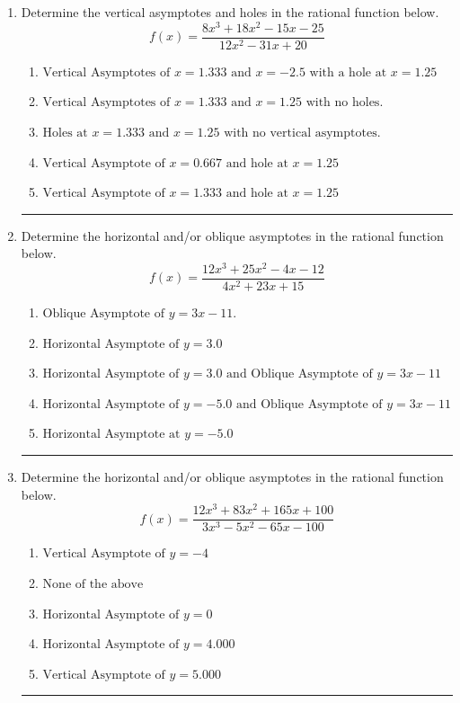 \documentclass[14pt]{extbook}
\newcommand{\litem}[1]{\item#1\hspace*{-1cm}\rule{\textwidth}{0.4pt}}
\begin{document}
\begin{enumerate}
{\begin{enumerate}[label=\Alph*.]
\end{enumerate} }
\litem{
Determine the vertical asymptotes and holes in the rational function below.\[ f(x) = \frac{8x^{3} +18 x^{2} -15 x -25}{12x^{2} -31 x + 20} \]\begin{enumerate}[label=\Alph*.]
\item \( \text{Vertical Asymptotes of } x = 1.333 \text{ and } x = -2.5 \text{ with a hole at } x = 1.25 \)
\item \( \text{Vertical Asymptotes of } x = 1.333 \text{ and } x = 1.25 \text{ with no holes.} \)
\item \( \text{Holes at } x = 1.333 \text{ and } x = 1.25 \text{ with no vertical asymptotes.} \)
\item \( \text{Vertical Asymptote of } x = 0.667 \text{ and hole at } x = 1.25 \)
\item \( \text{Vertical Asymptote of } x = 1.333 \text{ and hole at } x = 1.25 \)

\end{enumerate} }
\litem{
Determine the horizontal and/or oblique asymptotes in the rational function below.\[ f(x) = \frac{12x^{3} +25 x^{2} -4 x -12}{4x^{2} +23 x + 15} \]\begin{enumerate}[label=\Alph*.]
\item \( \text{Oblique Asymptote of } y = 3x -11. \)
\item \( \text{Horizontal Asymptote of } y = 3.0  \)
\item \( \text{Horizontal Asymptote of } y = 3.0 \text{ and Oblique Asymptote of } y = 3x -11 \)
\item \( \text{Horizontal Asymptote of } y = -5.0 \text{ and Oblique Asymptote of } y = 3x -11 \)
\item \( \text{Horizontal Asymptote at } y = -5.0 \)

\end{enumerate} }
\litem{
Determine the horizontal and/or oblique asymptotes in the rational function below.\[ f(x) = \frac{12x^{3} +83 x^{2} +165 x + 100}{3x^{3} -5 x^{2} -65 x -100} \]\begin{enumerate}[label=\Alph*.]
\item \( \text{Vertical Asymptote of } y = -4  \)
\item \( \text{None of the above} \)
\item \( \text{Horizontal Asymptote of } y = 0  \)
\item \( \text{Horizontal Asymptote of } y = 4.000  \)
\item \( \text{Vertical Asymptote of } y = 5.000  \)


\end{enumerate}}
\end{enumerate}
\end{document}
